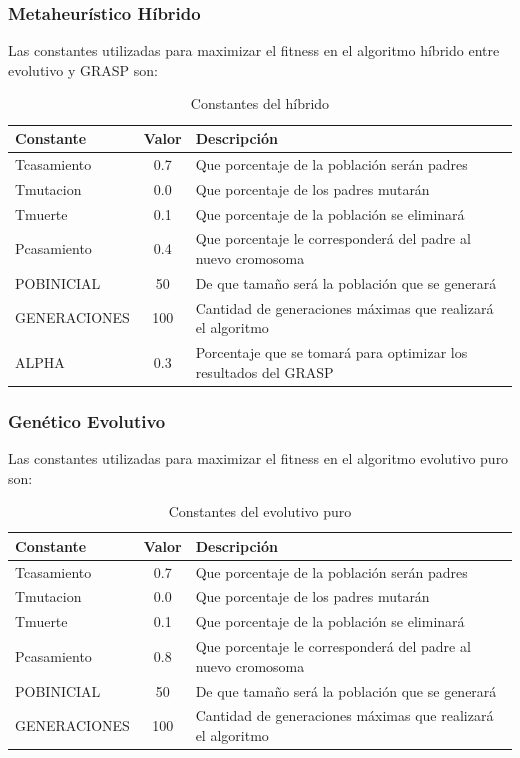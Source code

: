 \documentclass{article}
\begin{document}
\subsubsection{Metaheurístico Híbrido}
Las constantes utilizadas para maximizar el fitness en el algoritmo híbrido entre evolutivo y GRASP son: \newline
\begin{table}[H]
    \centering
    \begin{tabularx}{\columnwidth}{|l|c|X|}
        \hline
        Constante & Valor & Descripción \\
        \hline
        Tcasamiento & 0.7 & Que porcentaje de la población serán padres\\
        Tmutacion & 0.0 & Que porcentaje de los padres mutarán \\
        Tmuerte & 0.1 & Que porcentaje de la población se eliminará\\
        Pcasamiento & 0.4 & Que porcentaje le corresponderá del padre al nuevo cromosoma\\
        POBINICIAL & 50 & De que tamaño será la población que se generará\\
        GENERACIONES & 100 & Cantidad de generaciones máximas que realizará el algoritmo \\
        ALPHA & 0.3 & Porcentaje que se tomará para optimizar los resultados del GRASP\\
        \hline
    \end{tabularx}
    \caption{Constantes del híbrido}
    \label{tab:etiqueta}
\end{table}

\subsubsection{Genético Evolutivo}
Las constantes utilizadas para maximizar el fitness en el algoritmo evolutivo puro son: \newline
\begin{table}[H]
    \centering
    \begin{tabularx}{\columnwidth}{|l|c|X|}
        \hline
        Constante & Valor & Descripción \\
        \hline
        Tcasamiento & 0.7 & Que porcentaje de la población serán padres\\
        Tmutacion & 0.0 & Que porcentaje de los padres mutarán \\
        Tmuerte & 0.1 & Que porcentaje de la población se eliminará\\
        Pcasamiento & 0.8 & Que porcentaje le corresponderá del padre al nuevo cromosoma\\
        POBINICIAL & 50 & De que tamaño será la población que se generará\\
        GENERACIONES & 100 & Cantidad de generaciones máximas que realizará el algoritmo \\
        \hline
    \end{tabularx}
    \caption{Constantes del evolutivo puro}
    \label{tab:etiqueta}
\end{table}
\end{document}
